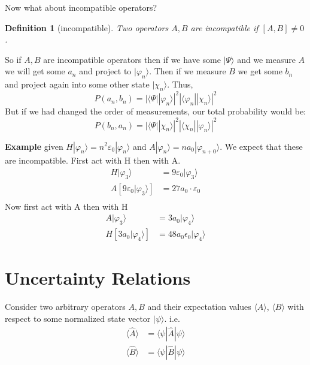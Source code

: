 \documentclass[a4paper, 11pt]{article}
\newtheorem*{definition}{Definition}
\newcommand{\ket}[1]{|#1\rangle}
\newcommand{\bra}[1]{\langle #1 |}
\newcommand{\expect}[1]{\langle #1 \rangle}
\newenvironment{solution}{%
	\begin{list}{}{%
			\setlength{\topsep}{0pt}%
			\setlength{\leftmargin}{1.5cm}%
			\setlength{\rightmargin}{1.5cm}%
			\setlength{\listparindent}{\parindent}%
			\setlength{\itemindent}{\parindent}%
			\setlength{\parsep}{\parskip}%
		}%
		\item[]}{\end{list}}
\begin{document}
	\noindent Now what about incompatible operators? 
		\begin{definition}[incompatible]
			Two operators $A,B$ are incompatible if $[A,B]\neq0$. 
		\end{definition}
	So if $A,B$ are incompatible operators then if we have some $\ket{\Psi}$ and we measure $A$ we will get some $a_n$ and project to $\ket{\varphi_n}$. Then if we measure $B$ we get some $b_n$ and project again into some other state $\ket{\chi_n}$. Thus, 
		\begin{equation*}
			P(a_n, b_n) = |\bra{\Psi}\ket{\varphi_n}|^2|\bra{\varphi_n}\ket{\chi_n}|^2
		\end{equation*}
	But if we had changed the order of measurements, our total probability would be: 
		\begin{equation*}
			P(b_n, a_n) = |\bra{\Psi}\ket{\chi_n}|^2|\bra{\chi_n}\ket{\varphi_n}|^2
		\end{equation*}
	\begin{solution}
		\noindent \textbf{Example} given $H\ket{\varphi_n} = n^2\varepsilon_0\ket{\varphi_n}$ and $A\ket{\varphi_n} = na_0\ket{\varphi_{n+0}}$. We expect that these are incompatible. First act with H then with A. 
			\begin{align*}
				H\ket{\varphi_3} &= 9\varepsilon_0\ket{\varphi_3} \\ 
				A[9\varepsilon_0\ket{\varphi_3}] &= 27a_0\cdot\varepsilon_0 \\ 
			\end{align*}
		Now first act with A then with H 
			\begin{align*}
				A\ket{\varphi_3} &= 3a_0\ket{\varphi_4} \\ 
				H[3a_0\ket{\varphi_4}] &= 48a_0 \epsilon_0 \ket{\varphi_4} 
			\end{align*}
	\end{solution}

\section*{Uncertainty Relations}
	\noindent Consider two arbitrary operators $A, B$ and their expectation values $\expect{A}$, $\expect{B}$ with respect to some normalized state vector $\ket{\psi}$. i.e.
		\begin{align*}
			\expect{\hat{A}} &= \bra{\psi}\hat{A}\ket{\psi} \\ 
			\expect{\hat{B}} &= \bra{\psi}\hat{B}\ket{\psi} 
		\end{align*}
		
\end{document}
